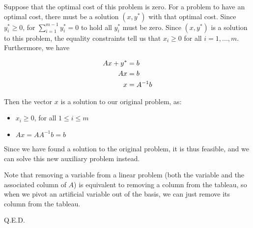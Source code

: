 Suppose that the optimal cost of this problem is zero. For a problem to have an optimal cost, there must be a solution $(x,y^*)$ with that optimal cost. Since $y_i^*\geq 0$, for $\sum_{i=1}^{m-1}y_i^*=0$ to hold all $y_i^*$ must be zero. Since $(x,y^*)$ is a solution to this problem, the equality constraints tell us that $x_i\geq 0$ for all $i=1, ...,m$. Furthermore, we have

\begin{align}
	Ax+y^*&=b\notag\\
	Ax&=b\notag\\
	x&=A^{-1}b \notag\\
\end{align}

Then the vector $x$ is a solution to our original problem, as:
\begin{itemize}
\item $x_i\geq 0$, for all $1\leq i\leq m$
\item $Ax=AA^{-1}b=b$
\end{itemize}

Since we have found a solution to the original problem, it is thus feasible, and we can solve this new auxiliary problem instead.

Note that removing a variable from a linear problem (both the variable and the associated column of $A$) is equivalent to removing a column from the tableau, so when we pivot an artificial variable out of the basis, we can just remove its column from the tableau.

Q.E.D.


